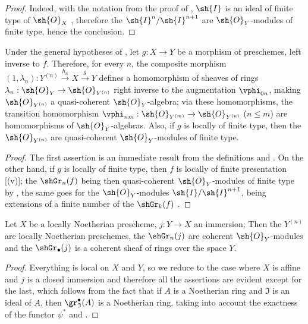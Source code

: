 \begin{proof}
Indeed, with the notation from the proof of , $\sh{I}$ is an ideal of finite type of $\sh{O}_X$ , therefore the $\sh{I}^n/\sh{I}^{n+1}$ are $\sh{O}_Y$-modules of finite type, hence the conclusion.
\end{proof}

\begin{corollary}[16.1.7]
\label{IV.16.1.7}
Under the general hypotheses of , let $g:X \to Y$ be a morphism of preschemes, left inverse to $f$.
Therefore, for every $n$, the composite morphism $(1, \lambda_n): Y^{(n)}\xrightarrow{h_n} X \xrightarrow{g} Y$ defines a homomorphism of sheaves of rings $\lambda_n: \sh{O}_Y \to \sh{O}_{Y^{(n)}}$ right inverse to the augmentation $\vphi_{0n}$, making $\sh{O}_{Y^{(n)}}$ a quasi-coherent $\sh{O}_Y$-algebra;
via these homomorphisms, the transition homomorphism $\vphi_{nm}:\sh{O}_{Y^{(m)}} \to \sh{O}_{Y^{(n)}}$ ($n\leq m$) are homomorphisms of $\sh{O}_Y$-algebras. 
Also, if $g$ is locally of finite type, then the $\sh{O}_{Y^{(n)}}$ are quasi-coherent $\sh{O}_Y$-modules of finite type.
\end{corollary}

\begin{proof}
The first assertion is an immediate result from the definitions and .
On the other hand, if $g$ is locally of finite type, then $f$ is locally of finite presentation [(v)];
the $\shGr_n(f)$ being then quasi-coherent $\sh{O}_Y$-modules of finite type by , the same goes for the $\sh{O}_Y$-modules $\sh{I}/\sh{I}^{n+1}$, being extensions of a finite number of the $\shGr_k(f)$ .
\end{proof}

\begin{proposition}[16.1.8]
\label{IV.16.1.8}
Let $X$ be a locally Noetherian prescheme, $j:Y \to X$ an immersion;
Then the $Y^{(n)}$ are locally Noetherian preschemes, the $\shGr_n(j)$ are coherent $\sh{O}_Y$-modules and the $\shGr_\bullet(j)$ is a coherent sheaf of rings over the space $Y$.
\end{proposition}

\begin{proof}
Everything is local on $X$ and $Y$, so we reduce to the case where $X$ is affine and $j$ is a closed immersion and therefore all the assertions are evident except for the last, which follows from the fact that if $A$ is a Noetherian ring and $\mathfrak{I}$ is an ideal of $A$, then $\gr_\mathfrak{I}^\bullet(A)$ is a Noetherian ring, taking into account the exactness of the functor $\psi^*$ and .
\end{proof}

